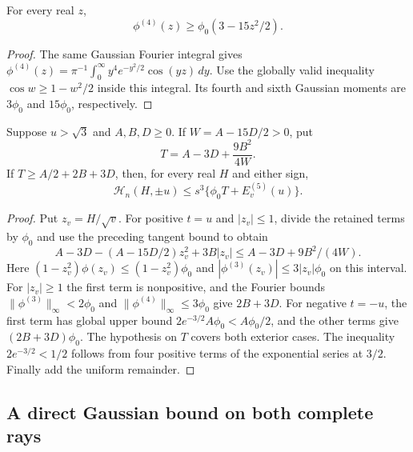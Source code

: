 \begin{lemma}
\label{ms:legacy-support:gaussian-tangent}
For every real $z$,
\[
 \phi^{(4)}(z)\ge\phi_0(3-15z^2/2).
\]
\end{lemma}
\begin{proof}
The same Gaussian Fourier integral gives
$\phi^{(4)}(z)=\pi^{-1}\int_0^\infty
y^4e^{-y^2/2}\cos(yz)\,dy$.
Use the globally valid inequality $\cos w\ge1-w^2/2$ inside
this integral. Its fourth and sixth Gaussian moments are $3\phi_0$
and $15\phi_0$, respectively.
\end{proof}

\begin{lemma}\label{ms:legacy-support:envelope}
Suppose $u>\sqrt3$ and $A,B,D\ge0$. If
$W=A-15D/2>0$, put
\[
 T=A-3D+\frac{9B^2}{4W}.
\]
If $T\ge A/2+2B+3D$, then, for every real $H$ and either sign,
\[
 \mathcal H_n(H,\pm u)\le s^3\{\phi_0 T+E^{(5)}_v(u)\}.
\]
\end{lemma}
\begin{proof}
Put $z_v=H/\sqrt v$. For positive $t=u$ and $|z_v|\le1$, divide the retained terms by
$\phi_0$ and use the preceding tangent bound to obtain
\[
 A-3D-(A-15D/2)z_v^2+3B|z_v|
 \le A-3D+9B^2/(4W).
\]
Here $(1-z_v^2)\phi(z_v)\le(1-z_v^2)\phi_0$ and
$|\phi^{(3)}(z_v)|\le3|z_v|\phi_0$ on this interval.
For $|z_v|\ge1$ the first term is nonpositive, and the Fourier bounds
$\|\phi^{(3)}\|_\infty<2\phi_0$ and
$\|\phi^{(4)}\|_\infty\le3\phi_0$ give $2B+3D$.
For negative $t=-u$, the first term has global upper bound
$2e^{-3/2}A\phi_0<A\phi_0/2$, and the other terms give
$(2B+3D)\phi_0$. The hypothesis on $T$ covers both exterior cases.
The inequality $2e^{-3/2}<1/2$ follows from four positive terms of
the exponential series at $3/2$. Finally add the uniform remainder.
\end{proof}

\subsection{A direct Gaussian bound on both complete rays}
\label{ms:legacy-support:far-gaussian-section}

